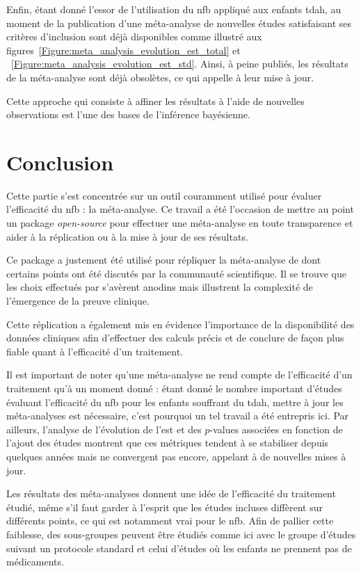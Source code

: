 Enfin, étant donné l'essor de l'utilisation du \gls{nfb} appliqué aux enfants \gls{tdah}, au moment de la publication d'une méta-analyse de nouvelles études satisfaisant ses critères d'inclusion
sont déjà disponibles comme illustré aux figures~\ref{Figure:meta_analysis_evolution_est_total} et ~\ref{Figure:meta_analysis_evolution_est_std}. Ainsi, à peine publiés, les résultats de la 
méta-analyse sont déjà obsolètes, ce qui appelle à leur mise à jour. 

Cette approche qui consiste à affiner les résultats à l'aide de nouvelles observations est l'une des bases de l'inférence bayésienne.

\section{Conclusion}

Cette partie s'est concentrée sur un outil couramment utilisé pour évaluer l'efficacité du \gls{nfb} : la méta-analyse. Ce travail a été l'occasion de mettre au point un package 
\textit{open-source} pour effectuer une méta-analyse en toute transparence et aider à la réplication ou à la mise à jour de ses résultats.

Ce package a justement été utilisé pour répliquer la méta-analyse de \citet{Cortese2016} dont certains points ont été discutés par la communauté scientifique. 
Il se trouve que les choix effectués par \citet{Cortese2016} s'avèrent anodins mais illustrent la complexité de l'émergence de la preuve
clinique.

Cette réplication a également mis en évidence l'importance de la disponibilité des données cliniques afin d'effectuer des calculs précis et de conclure de façon
plus fiable quant à l'efficacité d'un traitement. 

Il est important de noter qu'une méta-analyse ne rend compte de l'efficacité d'un traitement qu'à un moment donné : étant donné le nombre important d'études évaluant l'efficacité du \gls{nfb} 
pour les enfants souffrant du \gls{tdah}, mettre à jour les méta-analyses est nécessaire, c'est pourquoi un tel travail a été entrepris ici. Par ailleurs, l'analyse de l'évolution de l'\gls{est} et des $p$-values 
associées en fonction de l'ajout des études montrent que ces métriques tendent à se stabiliser depuis quelques années mais ne convergent pas encore, appelant à de nouvelles mises à jour.  

Les résultats des méta-analyses donnent une idée de l'efficacité du traitement étudié, même s'il faut garder à l'esprit que les études incluses
diffèrent sur différents points, ce qui est notamment vrai pour le \gls{nfb}. Afin de pallier cette faiblesse, des sous-groupes peuvent être étudiés comme ici avec le groupe d'études
suivant un protocole standard et celui d'études où les enfants ne prennent pas de médicaments.

